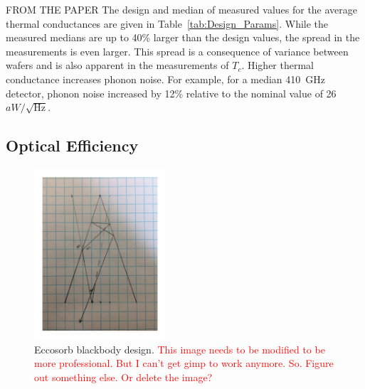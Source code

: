 FROM THE PAPER
The design and median of measured values for the average thermal conductances are given in Table~\ref{tab:Design_Params}. While the 
measured medians are up to 40\% larger than the design values, the spread in the measurements is even larger. This spread is 
a consequence of variance between wafers and is also apparent in the measurements of $T_{c}$. 
Higher thermal conductance increases phonon noise. For example, for a median 410~GHz detector, phonon noise increased by 
12\% relative to the nominal value of 26~$aW/\sqrt{\mathrm{Hz}}$. 



\subsection{Optical Efficiency}
\label{sec:optical_efficiency}


\begin{figure}[ht!]
\begin{center}
\includegraphics[height=2.5in]{figures/blackbody_design2}
\caption{Eccosorb blackbody design. \textcolor{red}{This image needs to be modified to be more professional. But I can't get gimp to work anymore. So. Figure out something else. Or delete the image?}
\label{fig:blackbody_design} }
\end{center}
\end{figure}

